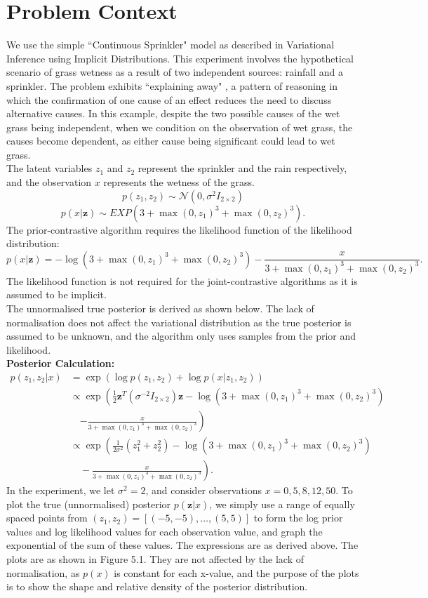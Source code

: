 \documentclass[honours,12pt]{unswthesis}
\numberwithin{equation}{section}
\theoremstyle{definition}
\begin{document}
\section{Problem Context}
We use the simple ``Continuous Sprinkler" model as described in Variational Inference using Implicit Distributions\citep{huszar}. This experiment involves the hypothetical scenario of grass wetness as a result of two independent sources: rainfall and a sprinkler. The problem exhibits ``explaining away" \citep{explain}, a pattern of reasoning in which the confirmation of one cause of an effect reduces the need to discuss alternative causes. In this example, despite the two possible causes of the wet grass being independent, when we condition on the observation of wet grass, the causes become dependent, as either cause being significant could lead to wet grass.\\ 
The latent variables $z_1$ and $z_2$ represent the sprinkler and the rain respectively, and the observation $x$ represents the wetness of the grass.
\[p(z_1,z_2)\sim \mathcal{N} (0,\sigma^2 I_{2\times 2})\]
\[p(x|\bm{z})\sim EXP(3+\max(0,z_1)^3+\max(0,z_2)^3).\]
The prior-contrastive algorithm requires the likelihood function of the likelihood distribution:
\[p(x|\bm{z})=-\log (3+\max (0,z_1)^3+\max(0,z_2)^3)-\frac{x}{3+\max (0,z_1)^3+\max(0,z_2)^3}.\]
The likelihood function is not required for the joint-contrastive algorithms as it is assumed to be implicit.\\
The unnormalised true posterior is derived as shown below. The lack of normalisation does not affect the variational distribution as the true posterior is assumed to be unknown, and the algorithm only uses samples from the prior and likelihood.\\
\textbf{Posterior Calculation:}
\begin{align*}
p(z_1,z_2|x)&= \exp(\log p(z_1,z_2)+\log p(x|z_1,z_2))\\
&\propto\exp\left(\frac12\bm{z}^T(\sigma^{-2}I_{2\times 2})\bm{z}-\log (3+\max(0,z_1)^3+\max(0,z_2)^3)\right.\\
&\quad\left.-\frac{x}{3+\max(0,z_1)^3+\max(0,z_2)^3}\right)\\
&\propto \exp\left(\frac{1}{2\sigma^2}(z_1^2+z_2^2)-\log (3+\max(0,z_1)^3+\max(0,z_2)^3)\right.\\
&\left.\quad-\frac{x}{3+\max(0,z_1)^3+\max(0,z_2)^3}\right).
\end{align*}
In the experiment, we let $\sigma^2=2$, and consider observations $x=0,5,8,12,50$. To plot the true (unnormalised) posterior $p(\bm{z}|x)$, we simply use a range of equally spaced points from $(z_1,z_2)=[(-5,-5),\dots, (5,5)]$ to form the log prior values and log likelihood values for each observation value, and graph the exponential of the sum of these values. The expressions are as derived above. The plots are as shown in Figure 5.1. They are not affected by the lack of normalisation, as $p(x)$ is constant for each x-value, and the purpose of the plots is to show the shape and relative density of the posterior distribution.\\
\end{document}
